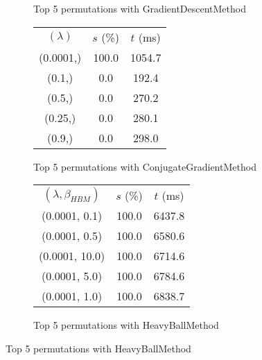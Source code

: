 \begin{figure}[H]
\begin{subfigure}[ht]{.5\textwidth}
\caption{Top 5 permutations with GradientDescentMethod}
\label{subfig:param_comp_MatrixSquareSum_GradientDescentMethod_ConstantSearch}
\end{subfigure}
\hfill
\begin{subfigure}[ht]{.5\textwidth}
\begin{tabular}{|c|c|c|}
\hline
\rowcolor{gray!25}
\multicolumn{3}{|c|}{ConjugateGradientMethod} \\
\hline
\rowcolor{gray!25}
$(\lambda)$ & $s$ (\%) & $t$ (ms) \\
\hline
(0.0001,) & 100.0 & 1054.7 \\
(0.1,) & 0.0 & 192.4 \\
(0.5,) & 0.0 & 270.2 \\
(0.25,) & 0.0 & 280.1 \\
(0.9,) & 0.0 & 298.0 \\
\hline
\end{tabular}
\caption{Top 5 permutations with ConjugateGradientMethod}
\label{subfig:param_comp_MatrixSquareSum_ConjugateGradientMethod_ConstantSearch}
\end{subfigure}
\hfill
\begin{subfigure}[ht]{.5\textwidth}
\begin{tabular}{|c|c|c|}
\hline
\rowcolor{gray!25}
\multicolumn{3}{|c|}{HeavyBallMethod} \\
\hline
\rowcolor{gray!25}
$(\lambda,\beta_{HBM})$ & $s$ (\%) & $t$ (ms) \\
\hline
(0.0001, 0.1) & 100.0 & 6437.8 \\
(0.0001, 0.5) & 100.0 & 6580.6 \\
(0.0001, 10.0) & 100.0 & 6714.6 \\
(0.0001, 5.0) & 100.0 & 6784.6 \\
(0.0001, 1.0) & 100.0 & 6838.7 \\
\hline
\end{tabular}
\caption{Top 5 permutations with HeavyBallMethod}
\label{subfig:param_comp_MatrixSquareSum_HeavyBallMethod_ConstantSearch}
\end{subfigure}
\end{figure}

